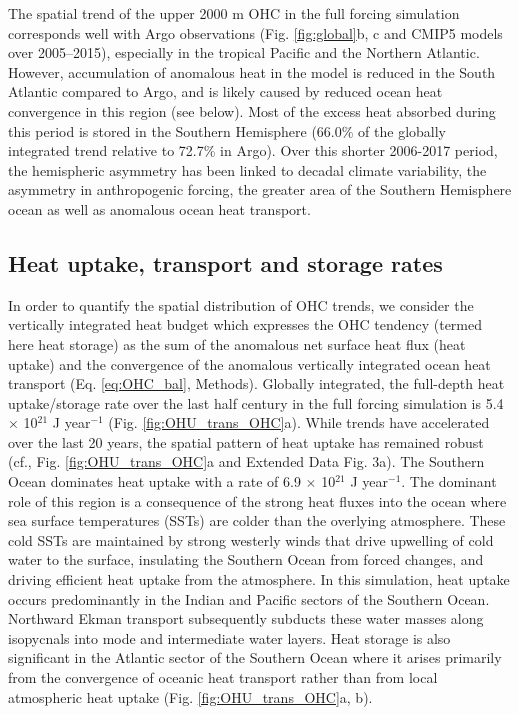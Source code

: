 \documentclass{nature}
\begin{document}
	The spatial trend of the upper 2000 m OHC in the full forcing simulation corresponds well with Argo observations\cite{argo2017gridded} (Fig. \ref{fig:global}b, c and CMIP5 models over 2005--2015\cite{rathore2020asymmetry}), especially in the tropical Pacific and the Northern Atlantic. However, accumulation of anomalous heat in the model is reduced in the South Atlantic compared to Argo, and is likely caused by reduced ocean heat convergence in this region (see below). Most of the excess heat absorbed during this period is stored in the Southern Hemisphere (66.0\% of the globally integrated trend relative to 72.7\% in Argo). Over this shorter 2006-2017 period, the hemispheric asymmetry has been linked to decadal climate variability\cite{rathore2020asymmetry}, the asymmetry in anthropogenic forcing\cite{irving2019anthropogenic}, the greater area of the Southern Hemisphere ocean\cite{Wijffels2016temperature} as well as anomalous ocean heat transport\cite{roemmich2015planetary}.
	
	\subsection{Heat uptake, transport and storage rates}
	In order to quantify the spatial distribution of OHC trends, we consider the vertically integrated heat budget which expresses the OHC tendency (termed here heat storage) as the sum of the anomalous net surface heat flux (heat uptake) and the convergence of the anomalous vertically integrated ocean heat transport (Eq. \ref{eq:OHC_bal}, Methods). Globally integrated, the full-depth heat uptake/storage rate over the last half century in the full forcing simulation is 5.4 $\times$ 10$^{21}$ J year$^{-1}$ (Fig. \ref{fig:OHU_trans_OHC}a). While trends have accelerated over the last 20 years, the spatial pattern of heat uptake has remained robust (cf., Fig. \ref{fig:OHU_trans_OHC}a and Extended Data Fig. 3a). The Southern Ocean dominates heat uptake with a rate of 6.9 $\times$ 10$^{21}$ J year$^{-1}$. The dominant role of this region is a consequence of the strong heat fluxes into the ocean where sea surface temperatures (SSTs) are colder than the overlying atmosphere. These cold SSTs are maintained by strong westerly winds that drive upwelling of cold water to the surface, insulating the Southern Ocean from forced changes, and driving efficient heat uptake from the atmosphere\cite{armour2016southern,marshall2015transient,frolicher2015dominance,morrison2016southern}. In this simulation, heat uptake occurs predominantly in the Indian and Pacific sectors of the Southern Ocean. Northward Ekman transport subsequently subducts these water masses along isopycnals into mode and intermediate water layers\cite{morrison2016southern}. Heat storage is also significant in the Atlantic sector of the Southern Ocean where it arises primarily from the convergence of oceanic heat transport rather than from local atmospheric heat uptake (Fig. \ref{fig:OHU_trans_OHC}a, b).
	
\end{document}
